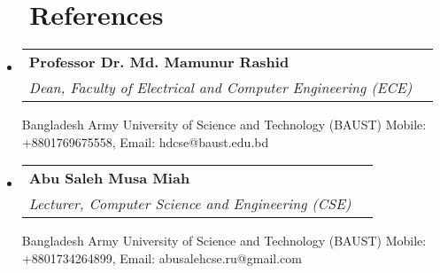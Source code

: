 \documentclass[a4paper,20pt]{article}
\makeatletter
\newcommand{\resumeSubheading}[4]{
  \vspace{-1pt}\item
    \begin{tabular*}{0.97\textwidth}{l@{\extracolsep{\fill}}r}
      \textbf{#1} & #2 \\
      \textit{#3} & \textit{#4} \\
    \end{tabular*}\vspace{-5pt}
}
\newcommand{\resumeSubHeadingListStart}{\begin{itemize}[leftmargin=*]}
\newcommand{\resumeSubHeadingListEnd}{\end{itemize}}
\makeatother
\begin{document}
\vspace{5pt}

\section{~~References}
  \resumeSubHeadingListStart
    \resumeSubheading
      {Professor Dr. Md. Mamunur Rashid}{} 
      {Dean, Faculty of Electrical and Computer Engineering (ECE)}{} 
      \hfill \break
      {Bangladesh Army University of Science and Technology (BAUST)
      \newline
      Mobile: +8801769675558, Email: hdcse@baust.edu.bd \DontPrintColon}
      
    \resumeSubheading
      {Abu Saleh Musa Miah}{} 
      {Lecturer, Computer Science and Engineering (CSE)}{} 
      \hfill \break
      {Bangladesh Army University of Science and Technology (BAUST)
      \newline
      Mobile: +8801734264899, Email: abusalehcse.ru@gmail.com \DontPrintColon}
  \resumeSubHeadingListEnd
\end{document}
